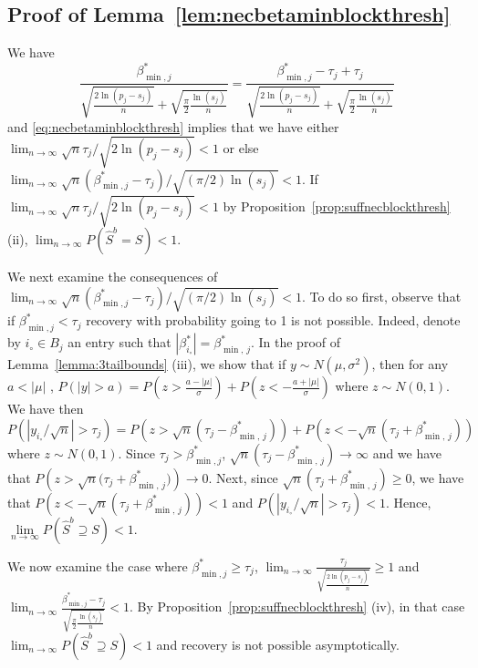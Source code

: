 \documentclass[bj,authoryear]{imsart}
\theoremstyle{plain}
\begin{document}
\subsection{Proof of Lemma~\ref{lem:necbetaminblockthresh}}
    We have $$\frac{\beta_{\min,j}^*}{\sqrt{\tfrac{2\ln(p_j-s_j)}{n}}+\sqrt{\tfrac{\pi}{2}\tfrac{\ln(s_j)}{n}}}= \frac{\beta_{\min,j}^*-\tau_j+\tau_j}{\sqrt{\tfrac{2\ln(p_j-s_j)}{n}}+\sqrt{\tfrac{\pi}{2}\tfrac{\ln(s_j)}{n}}}$$ and \eqref{eq:necbetaminblockthresh} implies that we have either $\lim_{n\to \infty}\sqrt{n}\tau_j/\sqrt{2\ln(p_j-s_j)} <1$ or else $\lim_{n\to \infty}\sqrt{n}(\beta_{\min,j}^*-\tau_j)/\sqrt{(\pi/2)\ln(s_j)} <1$. If $\lim_{n\to \infty}\sqrt{n}\tau_j/\sqrt{2\ln(p_j-s_j)} <1$ by Proposition~\ref{prop:suffnecblockthresh} (ii), $\lim_{n \to \infty} P(\hat{S}^{b} = S) < 1$. 
    
    We next examine the consequences of $\lim_{n\to \infty}\sqrt{n}(\beta_{\min,j}^*-\tau_j)/\sqrt{(\pi/2)\ln(s_j)} <1$. To do so first, observe that if $\beta_{\min,j}^*<\tau_j$ recovery with probability going to 1 is not possible. Indeed, denote by $i_{\circ}\in B_j$ an entry such that $|\beta_{i_{\circ}}^*|=\beta^*_{\min,\,j}$. In the proof of Lemma~\ref{lemma:3tailbounds} (iii), we show that if $y\sim N(\mu, \sigma^2)$, then for any $a<|\mu|$ , $P(|y|>a)  = P(z>\frac{a-|\mu|}{\sigma}) + P(z<-\frac{a+|\mu|}{\sigma})$ where $z\sim N(0,1)$. We have then
$$P(|y_{i_{\circ}}/\sqrt{n}|>\tau_j) 
    = P\left(z>\sqrt{n}\left(\tau_j-\beta_{\min,\,j}^*\right)\right) + P\left(z<-\sqrt{n}\left(\tau_j+\beta_{\min,\,j}^*\right)\right)$$ where $z\sim N(0,1)$. Since $\tau_j>\beta^*_{\min,j}$, $\sqrt{n}\left(\tau_j-\beta_{\min,\,j}^*\right)\to\infty$ and we have that $P(z>\sqrt{n}\big(\tau_j+\beta_{\min,\,j}^*\big)) \to 0$. Next, since $\sqrt{n}\left(\tau_j+\beta_{\min,\,j}^*\right)\geq0$, we have that $P\left(z<-\sqrt{n}\left(\tau_j+\beta_{\min,\,j}^*\right)\right)<1$ and $P(|y_{i_{\circ}}/\sqrt{n}|>\tau_j)<1$. Hence, $\underset{n \to \infty}{\lim}P\left(\hat{S}^{b} \supseteq S \right)<1$.
    
    We now examine the case where $\beta_{\min,j}^*\geq\tau_j$, $\lim_{n\to \infty}\frac{\tau_j}{\sqrt{\tfrac{2\ln(p_j-s_j)}{n}}} \geq 1$ and $\lim_{n\to \infty}\frac{\beta_{\min,j}^*-\tau_j}{\sqrt{\tfrac{\pi}{2}\tfrac{\ln(s_j)}{n}}} <1$. By Proposition~\ref{prop:suffnecblockthresh} (iv), in that case $\lim_{n \to \infty} P(\hat{S}^{b} \supseteq S ) < 1$ and recovery is not possible asymptotically.
\end{document}
